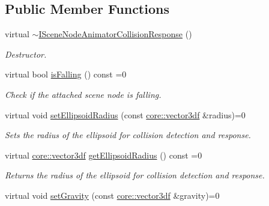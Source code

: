 \subsection*{Public Member Functions}
\begin{DoxyCompactItemize}
\item 
\mbox{\label{classirr_1_1scene_1_1ISceneNodeAnimatorCollisionResponse_ab6b85fb4f76e2d0c03cf2c6b326bddde}} 
virtual \hyperlink{classirr_1_1scene_1_1ISceneNodeAnimatorCollisionResponse_ab6b85fb4f76e2d0c03cf2c6b326bddde}{$\sim$\+I\+Scene\+Node\+Animator\+Collision\+Response} ()
\begin{DoxyCompactList}\small\item\em Destructor. \end{DoxyCompactList}\item 
virtual bool \hyperlink{classirr_1_1scene_1_1ISceneNodeAnimatorCollisionResponse_a66f5534c1d2ac0e2ea52e7b21a3c91d7}{is\+Falling} () const =0
\begin{DoxyCompactList}\small\item\em Check if the attached scene node is falling. \end{DoxyCompactList}\item 
virtual void \hyperlink{classirr_1_1scene_1_1ISceneNodeAnimatorCollisionResponse_a71af73590016ba936340a79467690d3f}{set\+Ellipsoid\+Radius} (const \hyperlink{namespaceirr_1_1core_ae6e2b2a6c552833ebbd5b7463d03586b}{core\+::vector3df} \&radius)=0
\begin{DoxyCompactList}\small\item\em Sets the radius of the ellipsoid for collision detection and response. \end{DoxyCompactList}\item 
virtual \hyperlink{namespaceirr_1_1core_ae6e2b2a6c552833ebbd5b7463d03586b}{core\+::vector3df} \hyperlink{classirr_1_1scene_1_1ISceneNodeAnimatorCollisionResponse_a92965919db3dfbaab2d1f4987a2c52c1}{get\+Ellipsoid\+Radius} () const =0
\begin{DoxyCompactList}\small\item\em Returns the radius of the ellipsoid for collision detection and response. \end{DoxyCompactList}\item 
virtual void \hyperlink{classirr_1_1scene_1_1ISceneNodeAnimatorCollisionResponse_af366695a82153c144b58c65cb4d092f3}{set\+Gravity} (const \hyperlink{namespaceirr_1_1core_ae6e2b2a6c552833ebbd5b7463d03586b}{core\+::vector3df} \&gravity)=0

\end{DoxyCompactItemize}
